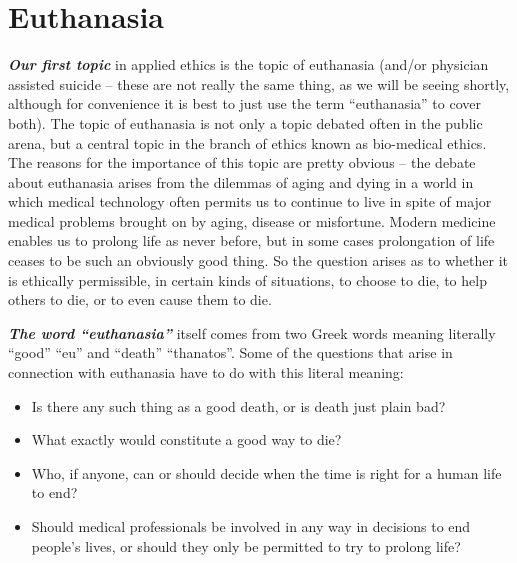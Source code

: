\documentclass[12pt, openany]{book}
\makeatletter
\providecommand{\tightlist}{%
  \setlength{\itemsep}{0pt}\setlength{\parskip}{0pt}}
\newenvironment{kframe}{%
\medskip{}
\setlength{\fboxsep}{.8em}
 \def\at@end@of@kframe{}%
 \ifinner\ifhmode%
  \def\at@end@of@kframe{\end{minipage}}%
  \begin{minipage}{\columnwidth}%
 \fi\fi%
 \def\FrameCommand##1{\hskip\@totalleftmargin \hskip-\fboxsep
 \colorbox{shadecolor}{##1}\hskip-\fboxsep
     \hskip-\linewidth \hskip-\@totalleftmargin \hskip\columnwidth}%
 \MakeFramed {\advance\hsize-\width
   \@totalleftmargin\z@ \linewidth\hsize
   \@setminipage}}%
 {\par\unskip\endMakeFramed%
 \at@end@of@kframe}
\newenvironment{rmdblock}[1]
  {
  \begin{itemize}
  \renewcommand{\labelitemi}{
    \raisebox{-.7\height}[0pt][0pt]{
      {\setkeys{Gin}{width=3em,keepaspectratio}\texttt{[image: img/\#1]}}
    }
  }
  \setlength{\fboxsep}{1em}
  \begin{kframe}
  \item
  }
  {
  \end{kframe}
  \end{itemize}
  }
\newenvironment{question}
  {\begin{rmdblock}{question}}
  {\end{rmdblock}}
\makeatother
\begin{document}
\hypertarget{euthanasia}{%
\chapter{Euthanasia}\label{euthanasia}}

\textbf{\emph{Our first topic}} in applied ethics is the topic of euthanasia (and/or physician assisted suicide -- these are not really the same thing, as we will be seeing shortly, although for convenience it is best to just use the term ``euthanasia'' to cover both). The topic of euthanasia is not only a topic debated often in the public arena, but a central topic in the branch of ethics known as bio-medical ethics. The reasons for the importance of this topic are pretty obvious -- the debate about euthanasia arises from the dilemmas of aging and dying in a world in which medical technology often permits us to continue to live in spite of major medical problems brought on by aging, disease or misfortune. Modern medicine enables us to prolong life as never before, but in some cases prolongation of life ceases to be such an obviously good thing. So the question arises as to whether it is ethically permissible, in certain kinds of situations, to choose to die, to help others to die, or to even cause them to die.

\textbf{\emph{The word ``euthanasia''}} itself comes from two Greek words meaning literally ``good'' ``eu'' and ``death'' ``thanatos''. Some of the questions that arise in connection with euthanasia have to do with this literal meaning:

\begin{question}

\begin{itemize}
\tightlist
\item
  Is there any such thing as a good death, or is death just plain bad?
\item
  What exactly would constitute a good way to die?
\item
  Who, if anyone, can or should decide when the time is right for a human life to end?
\item
  Should medical professionals be involved in any way in decisions to end people's lives, or should they only be permitted to try to prolong life?
\end{itemize}

\end{question}
\end{document}
